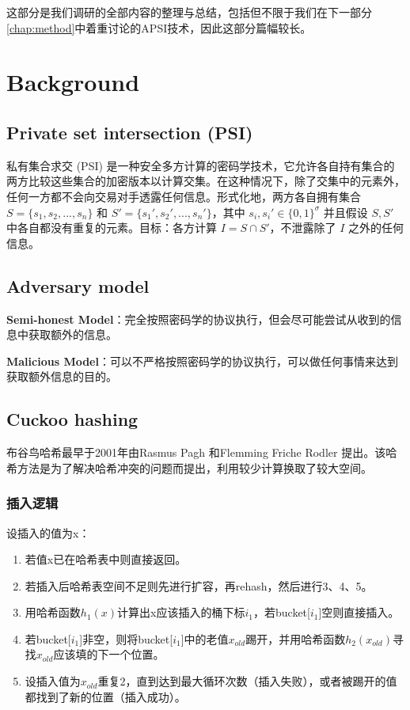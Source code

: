 \begin{remark}
这部分是我们调研的全部内容的整理与总结，包括但不限于我们在下一部分\ref{chap:method}中着重讨论的APSI技术，因此这部分篇幅较长。
\end{remark}

\section{Background}
\subsection{Private set intersection (PSI)}
私有集合求交 (PSI) 是一种安全多方计算的密码学技术，它允许各自持有集合的两方比较这些集合的加密版本以计算交集。在这种情况下，除了交集中的元素外，任何一方都不会向交易对手透露任何信息。形式化地，两方各自拥有集合 $S=\{s_1,s_2,...,s_n\}$ 和 $S'=\{s_1',s_2',...,s_n'\}$，其中 $s_i,s_i'\in\{0,1\}^\sigma$ 并且假设 $S,S'$ 中各自都没有重复的元素。目标：各方计算 $I=S\cap S'$，不泄露除了 $I$ 之外的任何信息。

\subsection{Adversary model}
\noindent\textbf{Semi-honest Model}：完全按照密码学的协议执行，但会尽可能尝试从收到的信息中获取额外的信息。

\noindent\textbf{Malicious Model}：可以不严格按照密码学的协议执行，可以做任何事情来达到获取额外信息的目的。

\subsection{Cuckoo hashing}\cite{charlesCuckoo}
布谷鸟哈希最早于2001年由Rasmus Pagh 和Flemming Friche Rodler 提出。该哈希方法是为了解决哈希冲突的问题而提出，利用较少计算换取了较大空间。

\subsubsection{插入逻辑}
\noindent 设插入的值为x：
\begin{enumerate}
    \item 若值x已在哈希表中则直接返回。
    \item 若插入后哈希表空间不足则先进行扩容，再rehash，然后进行3、4、5。
    \item 用哈希函数$h_1(x)$计算出x应该插入的桶下标$i_1$，若bucket[$i_1$]空则直接插入。
    \item 若bucket[$i_1$]非空，则将bucket[$i_1$]中的老值$x_{old}$踢开，并用哈希函数$h_2(x_{old})$寻找$x_{old}$应该填的下一个位置。
    \item 设插入值为$x_{old}$重复2，直到达到最大循环次数（插入失败），或者被踢开的值都找到了新的位置（插入成功）。
\end{enumerate}


